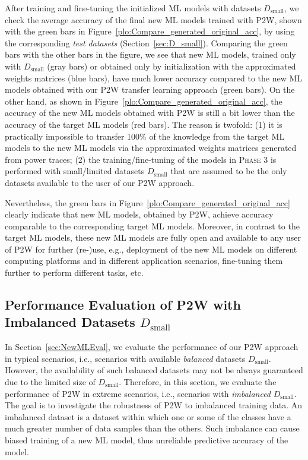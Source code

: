 \documentclass[letterpaper]{article}
\begin{document}
After training and fine-tuning the initialized ML models with datasets $D_{\text{small}}$, we check the average accuracy of the final new ML models trained with P2W, shown with the green bars in Figure~\ref{plo:Compare_generated_original_acc}, by using the corresponding \emph{test datasets} (Section~\ref{sec:D_small}). Comparing the green bars with the other bars in the figure, we see that new ML models, trained only with $D_{\text{small}}$ (gray bars) or obtained only by initialization with the approximated weights matrices (blue bars), have much lower accuracy compared to the new ML models obtained with our P2W transfer learning approach (green bars). On the other hand, as shown in Figure~\ref{plo:Compare_generated_original_acc}, the accuracy of the new ML models obtained with P2W is still a bit lower than the accuracy of the target ML models (red bars). The reason is twofold: (1) it is practically impossible to transfer 100\% of the knowledge from the target ML models to the new ML models via the approximated weights matrices generated from power traces; (2) the training/fine-tuning of the models in \textsc{Phase 3} is performed with small/limited datasets $D_{\text{small}}$ that are assumed to be the only datasets available to the user of our P2W approach.


Nevertheless, the green bars in Figure~\ref{plo:Compare_generated_original_acc} clearly indicate that new ML models, obtained by P2W, achieve accuracy comparable to the corresponding  target ML models. Moreover, in contrast to the target ML models, these new ML models are fully open and available to any user of P2W for further (re-)use, e.g., deployment of the new ML models on different computing platforms and in different application scenarios, fine-tuning them further to perform different tasks, etc. 


\subsection{Performance Evaluation of P2W with Imbalanced Datasets $D_{\text{small}}$ 
} \label{sec:P2WEvalImbalanced}

In Section~\ref{sec:NewMLEval}, we evaluate the performance of our P2W approach in typical scenarios, i.e., scenarios with available \emph{balanced} datasets $D_{\text{small}}$. However, the availability of such balanced datasets may not be always guaranteed due to the limited size of $D_{\text{small}}$. Therefore, in this section, we evaluate the performance of P2W in extreme scenarios, i.e., scenarios with \emph{imbalanced} $D_{\text{small}}$. The goal is to investigate the robustness of P2W to imbalanced training data. An imbalanced dataset is a dataset  within which one or some of the classes have
a much greater number of data samples than the others. Such imbalance can cause biased training of a new ML model, thus unreliable predictive accuracy of the model.
\end{document}
